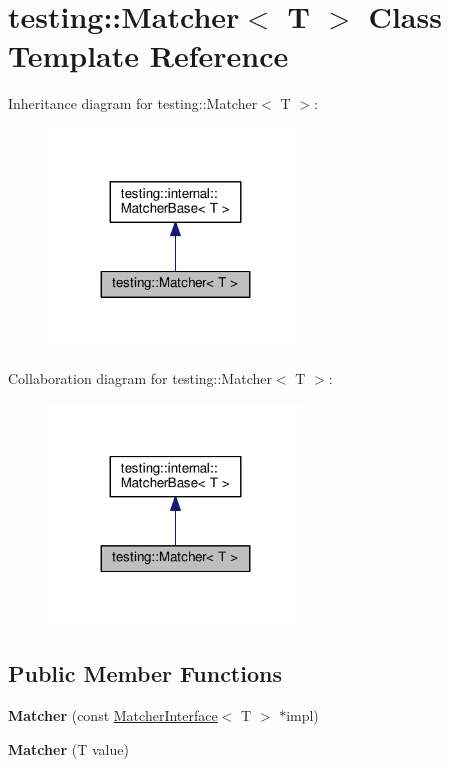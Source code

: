 \hypertarget{classtesting_1_1_matcher}{}\section{testing\+:\+:Matcher$<$ T $>$ Class Template Reference}
\label{classtesting_1_1_matcher}


Inheritance diagram for testing\+:\+:Matcher$<$ T $>$\+:
\nopagebreak
\begin{figure}[H]
\begin{center}
\leavevmode
\includegraphics[width=191pt]{classtesting_1_1_matcher__inherit__graph}
\end{center}
\end{figure}


Collaboration diagram for testing\+:\+:Matcher$<$ T $>$\+:
\nopagebreak
\begin{figure}[H]
\begin{center}
\leavevmode
\includegraphics[width=191pt]{classtesting_1_1_matcher__coll__graph}
\end{center}
\end{figure}
\subsection*{Public Member Functions}
\begin{DoxyCompactItemize}
\item 
\mbox{\label{classtesting_1_1_matcher_aea32eb3f86233853de91929fb2691bf3}} 
{\bfseries Matcher} (const \mbox{\hyperlink{classtesting_1_1_matcher_interface}{Matcher\+Interface}}$<$ T $>$ $\ast$impl)
\item 
\mbox{\label{classtesting_1_1_matcher_adc75e0bd47ffc75ba8a5f760372d0493}} 
{\bfseries Matcher} (T value)
\end{DoxyCompactItemize}
